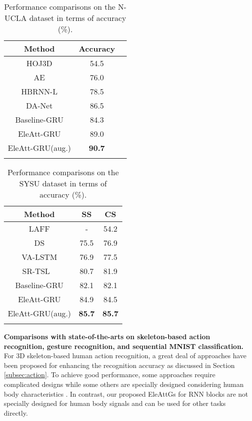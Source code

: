 \documentclass[journal]{IEEEtran}
\newcommand{\EleAttGn}{{EleAttG}}
\begin{document}
\setlength{\tabcolsep}{7pt}
\begin{table}[!t]
	\centering
	\caption{Performance comparisons on the N-UCLA dataset in terms of accuracy (\%).}
	\begin{tabular}{ccc}
		\toprule
		Method & Accuracy \\
		\midrule
		HOJ3D \cite{xia2012view}          & 54.5      \\ 
		AE  \cite{wang2013learning}            & 76.0    \\ 
		HBRNN-L \cite{du2016representation}        & 78.5     \\ 
		DA-Net \cite{wang2018dividing}   &86.5 \\
		\midrule
		Baseline-GRU & 84.3 \\
		EleAtt-GRU & 89.0 \\
		EleAtt-GRU(aug.) & \bf{90.7}\\ 
		\bottomrule     
		\label{tab:N-UCLA}
	\end{tabular}
\end{table}

\setlength{\tabcolsep}{7pt}
\begin{table}[!t]
	\centering
	\caption{Performance comparisons on the SYSU dataset in terms of accuracy (\%).}
	\begin{tabular}{ccc}
		\toprule
		Method & SS  & CS \\
		\midrule
		LAFF \cite{hu2016real} & - & 54.2 \\
		DS \cite{hu2015jointly} & 75.5 & 76.9 \\	
		VA-LSTM \cite{zhang2017view} & 76.9 & 77.5 \\
		SR-TSL \cite{si2018skeleton} \  &80.7 &81.9 \\
		\midrule
		Baseline-GRU  &  82.1  & 82.1 \\
		EleAtt-GRU & 84.9 & 84.5 \\
		EleAtt-GRU(aug.) & \bf{85.7} & \bf{85.7} \\
		\bottomrule      
		\label{tab:SYSU}
	\end{tabular}
	
\end{table}



\textbf{Comparisons with state-of-the-arts on skeleton-based action recognition, gesture recognition, and sequential MNIST classification.} For 3D skeleton-based human action recognition, a great deal of approaches have been proposed for enhancing the recognition accuracy as discussed in Section \ref{subsec:action}. To achieve good performance, some approaches require complicated designs \cite{liu2016spatio,liu2017global} while some others are specially designed considering human body characteristics \cite{du2015hierarchical,Shahroudy_2016_CVPR,song2017end}. In contrast, our proposed {\EleAttGn}s for RNN blocks are not specially designed for human body signals and can be used for other tasks directly. 
\end{document}
